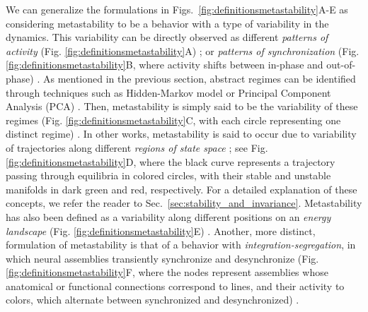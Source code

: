We can generalize the formulations in Figs.~\ref{fig:definitionsmetastability}A-E as considering metastability to be a behavior with a type of variability in the dynamics. This variability can be directly observed as different \textit{patterns of activity} (Fig. \ref{fig:definitionsmetastability}A) \cite{friston1997transients, friston2000transients, varela2001brainweb, roberts2019metastable}; or \textit{patterns of synchronization} (Fig. \ref{fig:definitionsmetastability}B, where activity shifts between in-phase and out-of-phase) \cite{cabral2011role, deco2017dynamics, deco2016metastability, poncealvarez2015restingstate, aguilera2016extended}. As mentioned in the previous section, abstract regimes can be identified through techniques such as Hidden-Markov model \cite{mazzucato2015dynamics, lacamera2019cortical, brinkman2022metastable} or Principal Component Analysis (PCA) \cite{sasaki2007metastability}. Then, metastability is simply said to be the variability of these regimes (Fig. \ref{fig:definitionsmetastability}C, with each circle representing one distinct regime) \cite{mazzucato2015dynamics, lacamera2019cortical, afraimovich2010longrange, alderson2020metastable, lee2017linking, vasa2015effects, hellyer2014control, naik2017metastability, rabinovich2008transientcognitive, cavanna2018dynamic, werner2007metastability, bhowmik2013metastability}. In other works, metastability is said to occur due to variability of trajectories along different \textit{regions of state space} \cite{hudson2017metastability, graben2019metastable}; see Fig. \ref{fig:definitionsmetastability}D, where the black curve represents a trajectory passing through equilibria in colored circles, with their stable and unstable manifolds in dark green and red, respectively. For a detailed explanation of these concepts, we refer the reader to Sec.~\ref{sec:stability_and_invariance}. Metastability has also been defined as a variability along different positions on an \textit{energy landscape} (Fig. \ref{fig:definitionsmetastability}E) \cite{gili2018metastable, cavanna2018dynamic, aguilera2016extended, hudson2017metastability}. Another, more distinct, formulation of metastability is that of a behavior with \textit{integration-segregation}, in which neural assemblies transiently synchronize and desynchronize (Fig. \ref{fig:definitionsmetastability}F, where the nodes represent assemblies whose anatomical or functional connections correspond to lines, and their activity to colors, which alternate between synchronized and desynchronized) \cite{deco2015rethinking, fingelkurts2001operational, tognoli2014metastable, tognoli2014enlarging, bressler2016coordination, kelso2012multistability, hellyer2015cognitive}. 
